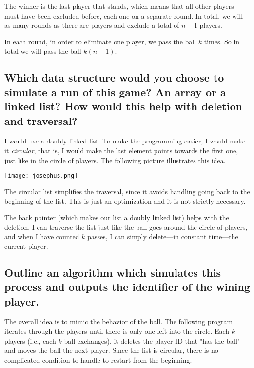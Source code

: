 \documentclass[11pt]{article}
\begin{document}
The winner is the last player that stands, which means that all
other players must have been excluded before, each one on a
separate round. In total, we will as many rounds as there are
players and exclude a total of \(n-1\) players.

In each round, in order to eliminate one player, we pass the
ball \(k\) times. So in total we will pass the ball \(k(n-1)\).

\subsection{Which data structure would you choose to simulate a run of this game? An array or a linked list? How would this help with deletion and traversal?}
\label{sec:orge9a9347}

I would use a doubly linked-list. To make the programming easier, I
would make it \emph{circular}, that is, I would make the last element
points towards the first one, just like in the circle of
players. The following picture illustrates this idea.

\begin{center}
\texttt{[image: josephus.png]}
\end{center}

The circular list simplifies the traversal, since it avoids
handling going back to the beginning of the list. This is just an
optimization and it is not strictly necessary.

The back pointer (which makes our list a doubly linked list)
helps with the deletion. I can traverse the list just like the
ball goes around the circle of players, and when I have counted
\(k\) passes, I can simply delete---in constant time---the current
player.


\subsection{Outline an algorithm which simulates this process and outputs the identifier of the wining player.}
\label{sec:orge33ff70}

The overall idea is to mimic the behavior of the ball. The
following program iterates through the players until there is only
one left into the circle. Each \(k\) players (i.e., each \(k\) ball
exchanges), it deletes the player ID that "has the ball" and moves
the ball the next player. Since the list is circular, there is no
complicated condition to handle to restart from the beginning.
\end{document}
